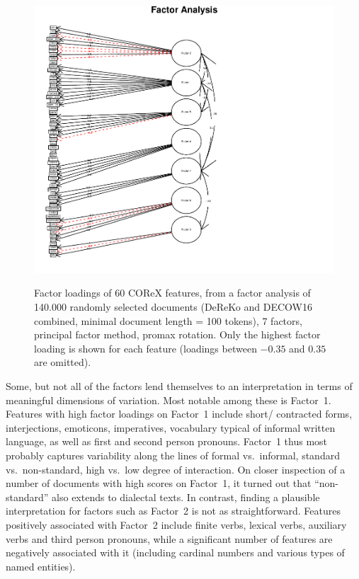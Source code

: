  
\begin{figure}
   \includegraphics[scale=.9]{../R/plots/fa-fa-7-promax-padded}
   \label{fa-pa-7-factors}
  \caption{Factor loadings of 60 COReX features, from a factor analysis of 140.000 randomly selected documents (DeReKo and DECOW16 combined, minimal document length = 100 tokens), 7 factors, principal factor method, promax rotation. Only the highest factor loading is shown for each feature (loadings between $-0.35$ and $0.35$ are omitted).}  
\end{figure}



Some, but not all of the factors lend themselves to an interpretation in terms of meaningful dimensions of variation.
Most notable among these is Factor~1.
Features with high factor loadings on Factor~1 include short/ contracted forms, interjections, emoticons, imperatives, vocabulary typical of informal written language, as well as first and second person pronouns.
Factor~1 thus most probably captures variability along the lines of formal vs.\ informal, standard vs.\ non-standard, high vs.\ low degree of interaction.
On closer inspection of a number of documents with high scores on Factor~1, it turned out that ``non-standard'' also extends to dialectal texts.
In contrast, finding a plausible interpretation for factors such as Factor~2 is not as straightforward.
Features positively associated with Factor~2 include finite verbs, lexical verbs, auxiliary verbs and third person pronouns, while a significant number of features are negatively associated with it (including cardinal numbers and various types of named entities).

